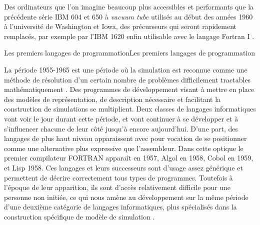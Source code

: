 Des ordinateurs que l'on imagine beaucoup plus accessibles et performants que la précédente série IBM 604 et 650  \autocite[584]{Barnes2004} à \textit{vacuum tube} utilisés au début des années 1960 à l'université de Washington  et Iowa, des précurseurs qui seront rapidement remplacés, par exemple par l'IBM 1620 enfin utilisable avec le langage Fortran I \autocite[66]{Berry2005}.

\medskip

\begin{testiv}{Les premiers langages de programmation}{Les premiers langages de programmation}

La période 1955-1965 est une période où la simulation est reconnue comme une méthode de résolution d'un certain nombre de problèmes difficilement tractables mathématiquement \autocite{Nance1993, Ackoff1961}. Des programmes de développement visant à mettre en place des modèles de représentation, de description nécessaire et facilitant la construction de simulations se multiplient. Deux classes de langages informatiques vont voir le jour durant cette période, et vont continuer à se développer et à s'influencer chacune de leur côté jusqu'à encore aujourd'hui. D'une part, des langages de plus haut niveau apparaissent avec pour vocation de se positionner comme une alternative plus expressive que l'assembleur. Dans cette optique le premier compilateur FORTRAN apparaît en 1957,  Algol en 1958, Cobol en 1959, et Lisp 1958. Ces langages et leurs successeurs sont d'usage assez générique et permettent de décrire correctement tous types de programmes. Toutefois à l'époque de leur apparition, ils sont d'accès relativement difficile pour une personne non initiée, ce qui nous amène au développement sur la même période d'une deuxième catégorie de langages informatiques, plus spécialisés dans la construction spécifique de modèle de simulation \autocite[239]{Naylor1966}.


\end{testiv}
